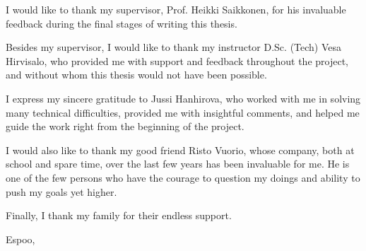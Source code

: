 I would like to thank my supervisor, Prof. Heikki Saikkonen, for his invaluable feedback during the final stages of writing this thesis.

Besides my supervisor, I would like to thank my instructor D.Sc. (Tech) Vesa Hirvisalo, who provided me with support and feedback throughout the project, and without whom this thesis would not have been possible.

I express my sincere gratitude to Jussi Hanhirova, who worked with me in solving many technical difficulties, provided me with insightful comments, and helped me guide the work right from the beginning of the project.

I would also like to thank my good friend Risto Vuorio, whose company, both at school and spare time, over the last few years has been invaluable for me. He is one of the few persons who have the courage to question my doings and ability to push my goals yet higher.

Finally, I thank my family for their endless support.

\vskip 10mm

\noindent Espoo, \DATE
\vskip 5mm
\noindent\AUTHOR

